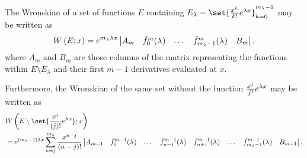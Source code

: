 \documentclass{article}
\begin{document}
\newcommand{\Wspec}[2]{\W{ E \setminus \set{\poly{#1} e^{\lambda_{#2} x}}}{x}}
\newcommand{\Detspec}[2]{\begin{vmatrix} \bar{g}_1^{m-1} & \dots & \bar{g}_{m_g}^{m-1} & \fmn{0}{m-1}(\lambda) & \dots & \fmn{#1 - 1}{m-1}(\lambda) & \fmn{#1 + 1}{m-1}(\lambda) & \dots & \fmn{#2}{m-1}(\lambda) \end{vmatrix}}
\newcommand{\Detspectwo}[1]{\begin{vmatrix} A_{m-1} & \fmn{0}{m-1}{} & \dots & \fmn{#1-1}{m-1}{} & \fmn{#1+1}{m-1}{} & \dots & \fmn{m_\lambda-1}{m-1}{} & B_{m-1} \end{vmatrix}}

\newcommand{\eone}{e^{(m_\lambda - 1)\lambda x}}

\begin{lemma} \label{lem:expgroup}
The Wronskian of a set of functions $E$ containing $E_\lambda = \set{\Poly{k} e^{\lambda x}}_{k=0}^{m_\lambda-1}$ may be written as
\begin{equation*}
\W{E}{x} = e^{m_\lambda \lambda x} \begin{vmatrix} A_m & \fmn{0}{m}{} & \dots & \fmn{m_\lambda-1}{m}{} & B_m \end{vmatrix} ,
\end{equation*}
where $A_m$ and $B_m$ are those columns of the matrix representing the functions within $E \setminus E_\lambda$ and their first $m-1$ derivatives evaluated at $x$.

Furthermore, the Wronskian of the same set without the function $\Poly{j} e^{\lambda x}$ may be written as
\begin{align*}
& \Wspec{j}{} \\
& = e^{(m_\lambda - 1) \lambda x} \sum_{n=j}^{m_\lambda} \poly{n-j} \Detspectwo{n} .
\end{align*}
\end{lemma}
\end{document}

